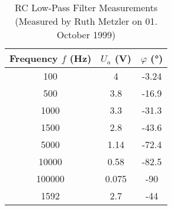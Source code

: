 \begin{appendix}
	\begin{table}[H]
		\centering
		\begin{tabular}{c|c|c}
			Frequency $f$ (Hz) & $U_a$ (V) & $\varphi$ (°) \\
			\hline\hline
			100 & 4 & -3.24 \\ \hline
			500 & 3.8 & -16.9 \\ \hline
			1000 & 3.3 & -31.3 \\ \hline
			1500 & 2.8 & -43.6 \\ \hline
			5000 & 1.14 & -72.4 \\ \hline
			10000 & 0.58 & -82.5 \\ \hline
			100000 & 0.075 & -90 \\ \hline
			1592 & 2.7 & -44 \\ \hline
		\end{tabular}
		\caption{RC Low-Pass Filter Measurements\\(Measured by Ruth Metzler on 01. October 1999)}
		\label{tab:RC_Low-Pass_Filter_Measurements}
	\end{table}
\end{appendix}
